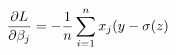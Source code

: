 \documentclass[preview]{standalone}
\begin{document}
\begin{align*}
\special{dvisvgm:raw <g id='unique000'>}\frac{\partial{L}}{\partial\beta_j}=-\frac{1}{n}\sum^n_{i=1}x_j(y-\sigma(z)\special{dvisvgm:raw </g>}
\end{align*}
\end{document}
